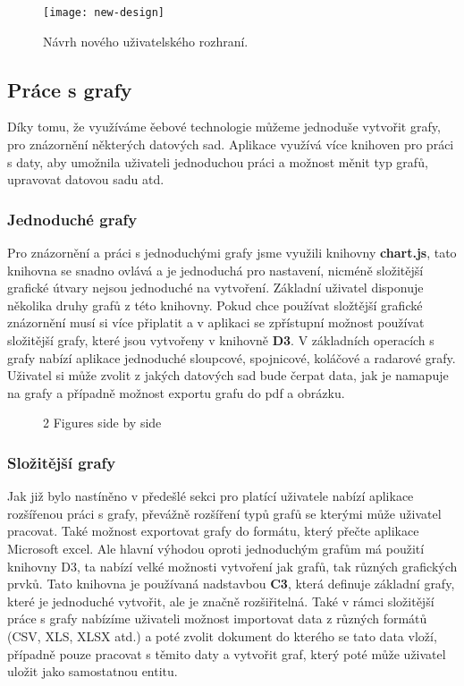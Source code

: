 \begin{figure}[htp]
  \centering
  \texttt{[image: new-design]}
  \caption{Návrh nového uživatelského rozhraní.}
  \label{new-ui}
\end{figure}

\subsection{Práce s grafy}
\par Díky tomu, že využíváme ěebové technologie můžeme jednoduše vytvořit grafy, pro znázornění některých datových sad. Aplikace využívá více knihoven pro práci s daty, aby umožnila uživateli jednoduchou práci a možnost měnit typ grafů, upravovat datovou sadu atd.

\subsubsection{Jednoduché grafy}
\par Pro znázornění a práci s jednoduchými grafy jsme využili knihovny \textbf{chart.js}, tato knihovna se snadno ovlává a je jednoduchá pro nastavení, nicméně složitější grafické útvary nejsou jednoduché na vytvoření. Základní uživatel disponuje několika druhy grafů z této knihovny. Pokud chce používat složtější grafické znázornění musí si více připlatit a v aplikaci se zpřístupní možnost používat složitější grafy, které jsou vytvořeny v knihovně \textbf{D3}. V základních operacích s grafy nabízí aplikace jednoduché sloupcové, spojnicové, koláčové a radarové grafy. Uživatel si může zvolit z jakých datových sad bude čerpat data, jak je namapuje na grafy a případně možnost exportu grafu do pdf a obrázku.
\begin{figure}[!htb]
    \centering
    \caption{2 Figures side by side}%
    \label{fig:example}%
\end{figure}

\subsubsection{Složitější grafy}
\par Jak již bylo nastíněno v předešlé sekci pro platící uživatele nabízí aplikace rozšířenou práci s grafy, převážně rozšíření typů grafů se kterými může uživatel pracovat. Také možnost exportovat grafy do formátu, který přečte aplikace Microsoft excel. Ale hlavní výhodou oproti jednoduchým grafům má použití knihovny D3, ta nabízí velké možnosti vytvoření jak grafů, tak různých grafických prvků. Tato knihovna je používaná nadstavbou \textbf{C3}, která definuje základní grafy, které je jednoduché vytvořit, ale je značně rozšiřitelná. Také v rámci složitější práce s grafy nabízíme uživateli možnost importovat data z různých formátů (CSV, XLS, XLSX atd.) a poté zvolit dokument do kterého se tato data vloží, případně pouze pracovat s těmito daty a vytvořit graf, který poté může uživatel uložit jako samostatnou entitu.

